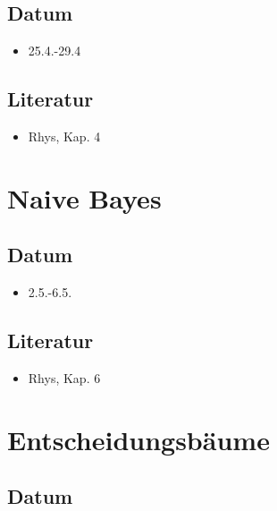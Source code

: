\documentclass[
]{book}
\providecommand{\tightlist}{%
  \setlength{\itemsep}{0pt}\setlength{\parskip}{0pt}}
\begin{document}
\hypertarget{datum-6}{%
\subsection{Datum}\label{datum-6}}

\begin{itemize}
\tightlist
\item
  25.4.-29.4
\end{itemize}

\hypertarget{literatur-6}{%
\subsection{Literatur}\label{literatur-6}}

\begin{itemize}
\tightlist
\item
  Rhys, Kap. 4
\end{itemize}

\hypertarget{naive-bayes}{%
\section{Naive Bayes}\label{naive-bayes}}

\hypertarget{datum-7}{%
\subsection{Datum}\label{datum-7}}

\begin{itemize}
\tightlist
\item
  2.5.-6.5.
\end{itemize}

\hypertarget{literatur-7}{%
\subsection{Literatur}\label{literatur-7}}

\begin{itemize}
\tightlist
\item
  Rhys, Kap. 6
\end{itemize}

\hypertarget{entscheidungsbuxe4ume}{%
\section{Entscheidungsbäume}\label{entscheidungsbuxe4ume}}

\hypertarget{datum-8}{%
\subsection{Datum}\label{datum-8}}
\end{document}
